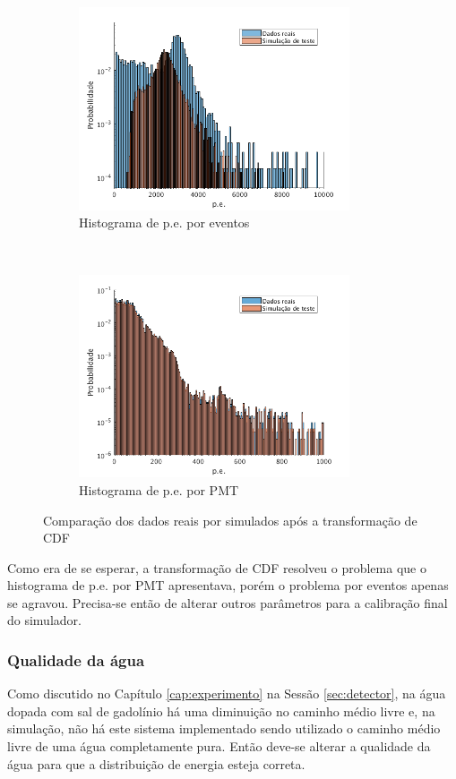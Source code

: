 \begin{figure}[ht]
	\centering
	\begin{subfigure}{0.5\textwidth}
		\centering
		\includegraphics[width=8cm]{textuais/simulacao/figuras/hist_evt2.png}
		\caption{Histograma de p.e. por eventos}
		\label{fig:a2}
	\end{subfigure}%
	~ 
	\begin{subfigure}{0.5\textwidth}
		\centering
		\includegraphics[width=8cm]{textuais/simulacao/figuras/hist_pmt2.png}
		\caption{Histograma de p.e. por PMT}
		\label{fig:b2}
	\end{subfigure}
	\caption{Comparação dos dados reais por simulados após a transformação de CDF}
\end{figure}

Como era de se esperar, a transformação de CDF resolveu o problema que o histograma de p.e. por PMT apresentava, porém o problema por eventos apenas se agravou. Precisa-se então de alterar outros parâmetros para a calibração final do simulador.

\subsubsection{Qualidade da água}

Como discutido no Capítulo \ref{cap:experimento} na Sessão \ref{sec:detector}, na água dopada com sal de gadolínio há uma diminuição no caminho médio livre e, na simulação, não há este sistema implementado sendo utilizado o caminho médio livre de uma água completamente pura. Então deve-se alterar a qualidade da água para que a distribuição de energia esteja correta.

